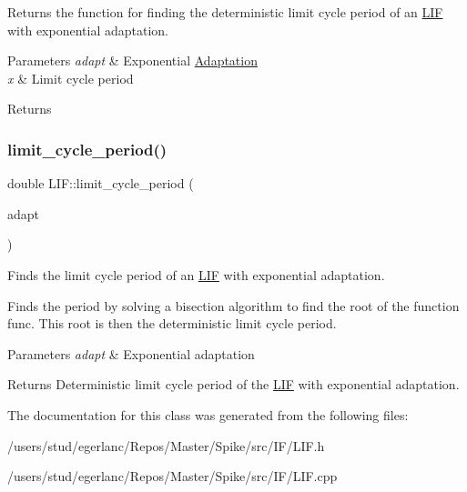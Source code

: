 Returns the function for finding the deterministic limit cycle period of an \hyperlink{classLIF}{L\+IF} with exponential adaptation. 


\begin{DoxyParams}{Parameters}
{\em adapt} & Exponential \hyperlink{classAdaptation}{Adaptation} \\
\hline
{\em x} & Limit cycle period \\
\hline
\end{DoxyParams}
\begin{DoxyReturn}{Returns}

\end{DoxyReturn}
\mbox{\label{classLIF_aabdcc6b846e7ec6effa76592badeb6cc}} 
\subsubsection{\texorpdfstring{limit\+\_\+cycle\+\_\+period()}{limit\_cycle\_period()}}
{\footnotesize\ttfamily double L\+I\+F\+::limit\+\_\+cycle\+\_\+period (\begin{DoxyParamCaption}\item[{\hyperlink{classExpAdaptation}{Exp\+Adaptation} \&}]{adapt }\end{DoxyParamCaption})}



Finds the limit cycle period of an \hyperlink{classLIF}{L\+IF} with exponential adaptation. 

Finds the period by solving a bisection algorithm to find the root of the function func. This root is then the deterministic limit cycle period. 
\begin{DoxyParams}{Parameters}
{\em adapt} & Exponential adaptation \\
\hline
\end{DoxyParams}
\begin{DoxyReturn}{Returns}
Deterministic limit cycle period of the \hyperlink{classLIF}{L\+IF} with exponential adaptation. 
\end{DoxyReturn}


The documentation for this class was generated from the following files\+:\begin{DoxyCompactItemize}
\item 
/users/stud/egerlanc/\+Repos/\+Master/\+Spike/src/\+I\+F/L\+I\+F.\+h\item 
/users/stud/egerlanc/\+Repos/\+Master/\+Spike/src/\+I\+F/L\+I\+F.\+cpp\end{DoxyCompactItemize}

